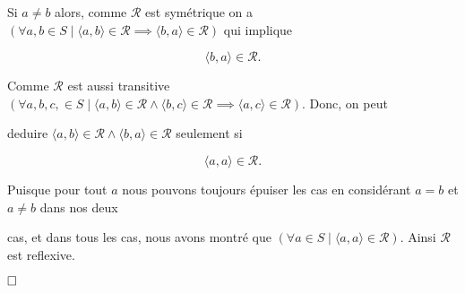 \documentclass{article}
\begin{document}
Si $a \neq b$ alors, comme $ \mathcal{R} $ est symétrique on a $(\forall a,b \in S \mid \langle a,b \rangle \in \mathcal{R} \implies \langle b,a \rangle \in \mathcal{R} )$ qui implique

$$\langle b,a \rangle \in \mathcal{R}.$$

Comme $\mathcal{R}$ est aussi transitive $ ( \forall a, b, c, \in S \mid \langle a,b \rangle \in \mathcal{R} \land \langle b,c \rangle \in \mathcal{R} \implies \langle a,c \rangle \in \mathcal{R} )$. Donc, on peut 

deduire $\langle a,b \rangle \in \mathcal{R} \land \langle b,a \rangle \in \mathcal{R}$ seulement si

$$\langle a,a \rangle \in \mathcal{R}.$$

Puisque pour tout $ a $ nous pouvons toujours épuiser les cas en considérant $a = b$ et $a \neq b$ dans nos deux 

cas, et dans tous les cas, nous avons montré que $( \forall a \in S \mid \langle a,a \rangle \in \mathcal{R} ) $. Ainsi $ \mathcal{R}$ est reflexive.

$\hfill \square$
\end{document}
